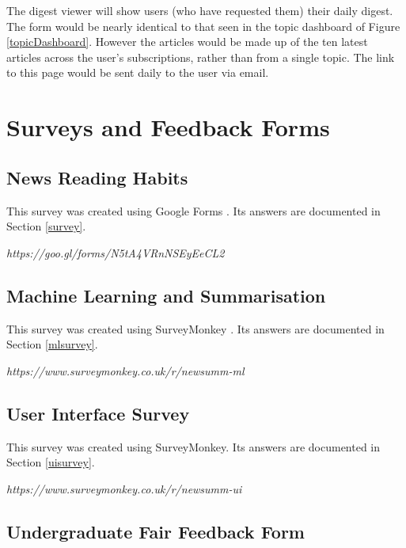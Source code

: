 \documentclass[12pt]{article}
\begin{document}
\begin{appendices}
The digest viewer will show users (who have requested them) their daily digest. The form would be nearly identical to that seen in the topic dashboard of Figure \ref{topicDashboard}. However the articles would be made up of the ten latest articles across the user's subscriptions, rather than from a single topic. The link to this page would be sent daily to the user via email.


\newpage

\section{Surveys and Feedback Forms}

\subsection{News Reading Habits}

\label{nrh}

This survey was created using Google Forms \cite{googleForms}. Its answers are documented in Section \ref{survey}.

\emph{https://goo.gl/forms/N5tA4VRnNSEyEeCL2}

\subsection{Machine Learning and Summarisation}

\label{mls}

This survey was created using SurveyMonkey \cite{surveymonkey}. Its answers are documented in Section \ref{mlsurvey}.

\emph{https://www.surveymonkey.co.uk/r/newsumm-ml}

\subsection{User Interface Survey}

\label{uis}

This survey was created using SurveyMonkey. Its answers are documented in Section \ref{uisurvey}.

\emph{https://www.surveymonkey.co.uk/r/newsumm-ui}

\subsection{Undergraduate Fair Feedback Form}


\end{appendices}
\end{document}
